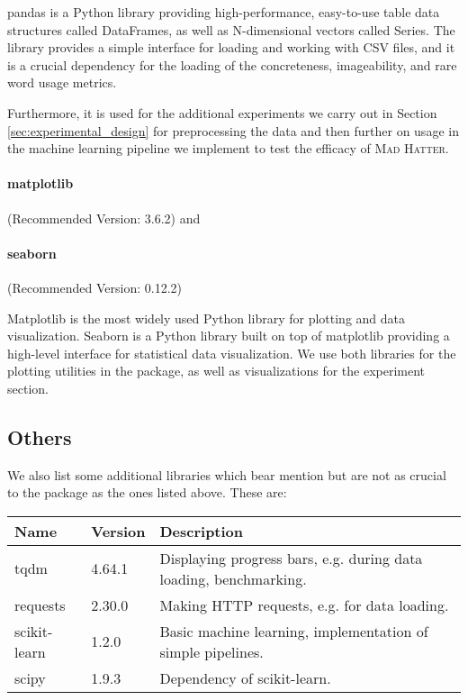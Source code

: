 pandas is a Python library providing high-performance, easy-to-use table data structures called DataFrames, as well as N-dimensional vectors called Series. The library provides a simple interface for loading and working with CSV files, and it is a crucial dependency for the loading of the concreteness, imageability, and rare word usage metrics.

Furthermore, it is used for the additional experiments we carry out in Section \ref{sec:experimental_design} for preprocessing the data and then further on usage in the machine learning pipeline we implement to test the efficacy of \textsc{Mad Hatter}.

\paragraph{matplotlib} (Recommended Version: 3.6.2) and \paragraph{seaborn} (Recommended Version: 0.12.2)

Matplotlib is the most widely used Python library for plotting and data visualization. Seaborn is a Python library built on top of matplotlib providing a high-level interface for statistical data visualization. We use both libraries for the plotting utilities in the package, as well as visualizations for the experiment section.


\subsection*{Others}


We also list some additional libraries which bear mention but are not as crucial to the package as the ones listed above. These are:

\begin{table}[htbp]
    \centering
    \begin{tabular}{lll}
        \toprule
        \textbf{Name} & \textbf{Version} & \textbf{Description} \\
        \midrule
        tqdm & 4.64.1 & Displaying progress bars, e.g. during data loading, benchmarking. \\
        requests & 2.30.0 & Making HTTP requests, e.g. for data loading. \\
        scikit-learn & 1.2.0 & Basic machine learning, implementation of simple pipelines. \\
        scipy & 1.9.3 & Dependency of scikit-learn. \\

        \bottomrule
    \end{tabular}
\end{table}
